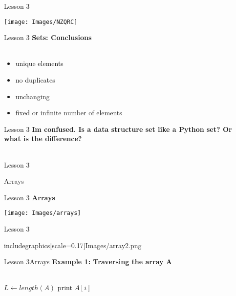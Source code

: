 \documentclass[aspectratio=1610]{beamer}
\begin{document}
\begin{frame}{Lesson 3}{}
\begin{center}
\texttt{[image: Images/NZQRC]}
\end{center}
\end{frame}


\begin{frame}{Lesson 3}{}
\LARGE
\textbf{Sets: Conclusions}\\~\\
\begin{itemize}
    \item unique elements
    \item no duplicates
    \item unchanging 
    \item fixed or infinite number of elements
\end{itemize}

\end{frame}


\begin{frame}{Lesson 3}{}
\LARGE
\textbf{Im confused. Is a data structure set like a Python set? Or what is the difference?}\\~\\
\end{frame}



\begin{frame}{Lesson 3}{}
\begin{center}
\Huge Arrays
\end{center}
\end{frame}

\begin{frame}{Lesson 3}{}
\LARGE
\textbf{Arrays}
\begin{center}
\texttt{[image: Images/arrays]}
\end{center}
\end{frame}


\begin{frame}{Lesson 3}{}
\begin{center}
includegraphics[scale=0.17]{Images/array2.png}
\end{center}
\end{frame}



\begin{frame}{Lesson 3}{Arrays}
\Large
\textbf{Example 1: Traversing the array A}\\~\\


\label{getArray}
\begin{algorithmic}[1]
 
\State $L\gets length(A)$
    \State print $A[i]$
\EndFor
\EndProcedure
\end{algorithmic}
\end{frame}
\end{document}
